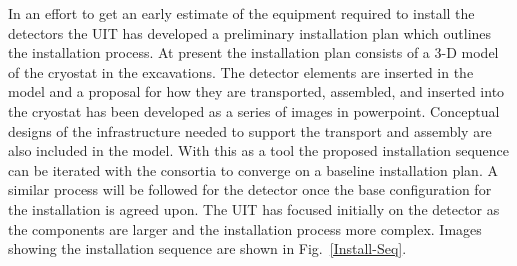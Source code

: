 In an effort to get an early estimate of the equipment required to
install the detectors the UIT has developed a preliminary installation
plan which outlines the installation process. At present the
installation plan consists of a 3-D model of the cryostat in the
excavations. The  detector elements are inserted in the
model and a proposal for how they are transported, assembled, and
inserted into the cryostat has been developed as a series of images in
powerpoint. Conceptual designs of the infrastructure needed to support
the transport and assembly are also included in the model. With this
as a tool the proposed installation sequence can be iterated with the
consortia to converge on a baseline installation plan. A similar
process will be followed for the  detector once the base
configuration for the  installation is agreed upon. The UIT
has focused initially on the  detector as the 
components are larger and the installation process more
complex. Images showing the  installation sequence are shown
in Fig.~\ref{Install-Seq}.
